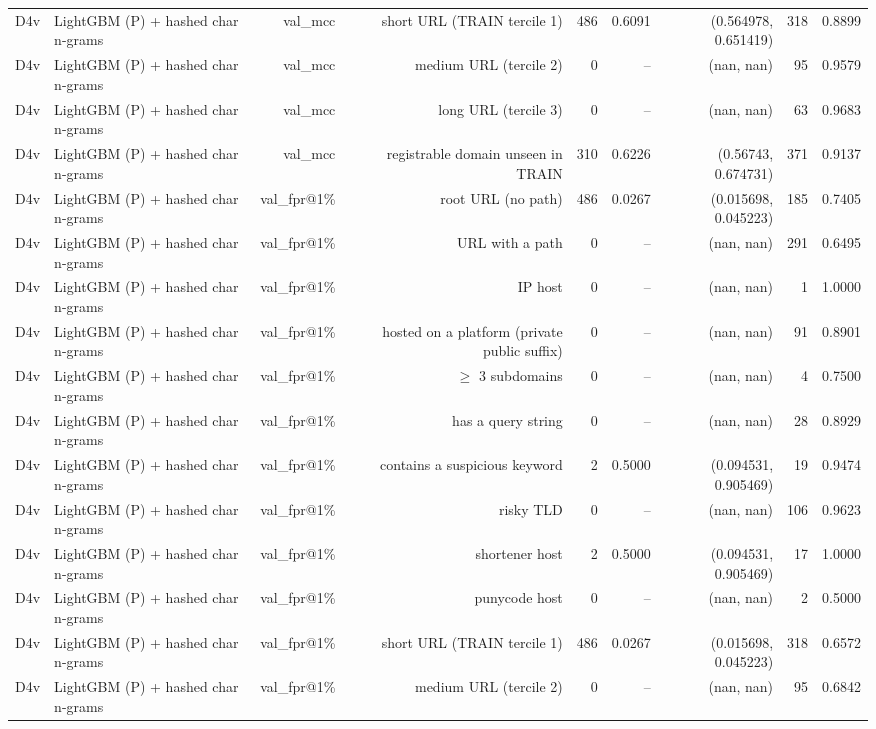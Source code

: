 \begin{table}[t]
\begin{tabular}{llrrrrrrr}
D4v & LightGBM (P) + hashed char n-grams & val\_mcc & short URL (TRAIN tercile 1) & 486 & 0.6091 & (0.564978, 0.651419) & 318 & 0.8899 \\
D4v & LightGBM (P) + hashed char n-grams & val\_mcc & medium URL (tercile 2) & 0 & -- & (nan, nan) & 95 & 0.9579 \\
D4v & LightGBM (P) + hashed char n-grams & val\_mcc & long URL (tercile 3) & 0 & -- & (nan, nan) & 63 & 0.9683 \\
D4v & LightGBM (P) + hashed char n-grams & val\_mcc & registrable domain unseen in TRAIN & 310 & 0.6226 & (0.56743, 0.674731) & 371 & 0.9137 \\
D4v & LightGBM (P) + hashed char n-grams & val\_fpr@1\% & root URL (no path) & 486 & 0.0267 & (0.015698, 0.045223) & 185 & 0.7405 \\
D4v & LightGBM (P) + hashed char n-grams & val\_fpr@1\% & URL with a path & 0 & -- & (nan, nan) & 291 & 0.6495 \\
D4v & LightGBM (P) + hashed char n-grams & val\_fpr@1\% & IP host & 0 & -- & (nan, nan) & 1 & 1.0000 \\
D4v & LightGBM (P) + hashed char n-grams & val\_fpr@1\% & hosted on a platform (private public suffix) & 0 & -- & (nan, nan) & 91 & 0.8901 \\
D4v & LightGBM (P) + hashed char n-grams & val\_fpr@1\% & $\geq$ 3 subdomains & 0 & -- & (nan, nan) & 4 & 0.7500 \\
D4v & LightGBM (P) + hashed char n-grams & val\_fpr@1\% & has a query string & 0 & -- & (nan, nan) & 28 & 0.8929 \\
D4v & LightGBM (P) + hashed char n-grams & val\_fpr@1\% & contains a suspicious keyword & 2 & 0.5000 & (0.094531, 0.905469) & 19 & 0.9474 \\
D4v & LightGBM (P) + hashed char n-grams & val\_fpr@1\% & risky TLD & 0 & -- & (nan, nan) & 106 & 0.9623 \\
D4v & LightGBM (P) + hashed char n-grams & val\_fpr@1\% & shortener host & 2 & 0.5000 & (0.094531, 0.905469) & 17 & 1.0000 \\
D4v & LightGBM (P) + hashed char n-grams & val\_fpr@1\% & punycode host & 0 & -- & (nan, nan) & 2 & 0.5000 \\
D4v & LightGBM (P) + hashed char n-grams & val\_fpr@1\% & short URL (TRAIN tercile 1) & 486 & 0.0267 & (0.015698, 0.045223) & 318 & 0.6572 \\
D4v & LightGBM (P) + hashed char n-grams & val\_fpr@1\% & medium URL (tercile 2) & 0 & -- & (nan, nan) & 95 & 0.6842 \\

\end{tabular}
\end{table}
